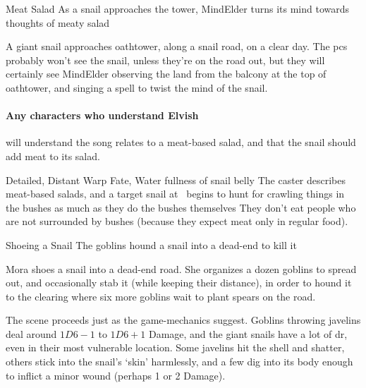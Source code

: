 
{Meat Salad}%
{As a snail approaches the tower, \gls{MindElder} turns its mind towards thoughts of meaty salad}%


A giant snail approaches \gls{oathtower}, along a snail road, on a clear day.
The \glspl{pc} probably won't see the snail, unless they're on the road out, but they will certainly see \gls{MindElder} observing the land from the balcony at the top of \gls{oathtower}, and singing a spell to twist the mind of the snail.

\paragraph{Any characters who understand Elvish}
will understand the song relates to a meat-based salad, and that the snail should add meat to its salad.

  {Detailed, Distant}%
  {Warp}%
  {Fate, Water}%
  {fullness of snail belly}%
  {The caster describes meat-based salads, and a target snail at \spellRange\ begins to hunt for crawling things in the bushes as much as they do the bushes themselves}%
  {They don't eat people who are not surrounded by bushes (because they expect meat only in regular food).}


{Shoeing a Snail}%
{The goblins hound a snail into a dead-end to kill it}%

Mora shoes a snail into a dead-end road.
She organizes a dozen goblins to spread out, and occasionally stab it (while keeping their distance), in order to hound it to the clearing where six more goblins wait to plant spears on the road.

The scene proceeds just as the game-mechanics suggest.
Goblins throwing javelins deal around $1D6-1$ to $1D6+1$ Damage, and the giant snails have a lot of \gls{dr}, even in their most vulnerable location.
Some javelins hit the shell and shatter, others stick into the snail's `skin' harmlessly, and a few dig into its body enough to inflict a minor wound (perhaps 1 or 2 Damage).

